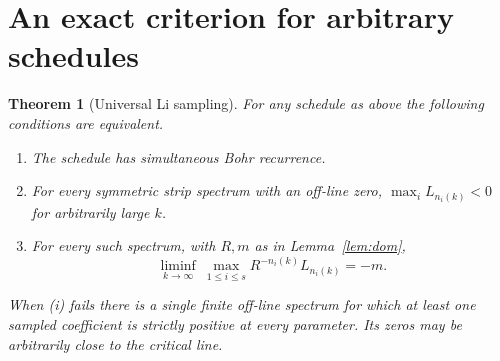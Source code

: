 \documentclass[11pt,letterpaper]{article}
\newtheorem{theorem}{Theorem}
\begin{document}
\section{An exact criterion for arbitrary schedules}
\begin{theorem}[Universal Li sampling]\label{thm:general}
For any schedule as above the following conditions are equivalent.
\begin{enumerate}[label=\textup{(\roman*)}]
\item The schedule has simultaneous Bohr recurrence.
\item For every symmetric strip spectrum with an off-line zero,
\(\max_i L_{n_i(k)}<0\) for arbitrarily large \(k\).
\item For every such spectrum, with \(R,m\) as in Lemma~\ref{lem:dom},
\[
 \liminf_{k\to\infty}\ \max_{1\le i\le s} R^{-n_i(k)} L_{n_i(k)}=-m .
\]
\end{enumerate}
When \textup{(i)} fails there is a single finite off-line spectrum for which at least one sampled coefficient is strictly positive at \emph{every} parameter. Its zeros may be arbitrarily close to the critical line.
\end{theorem}
\end{document}
